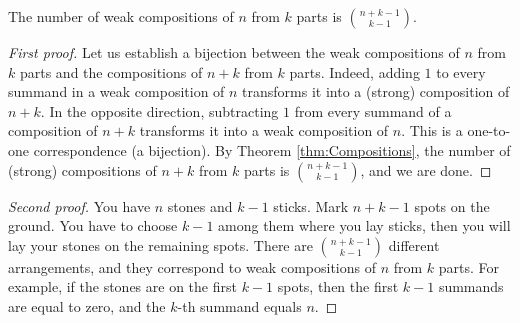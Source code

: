 \begin{page}
\setcounter{section}{3}
\setcounter{subsection}{5}
\setcounter{dfn}{13}
\label{portion:101}

\begin{thm}
\label{thm:WeakComp}
The number of weak compositions of $n$ from $k$ parts is $\binom{n+k-1}{k-1}$.
\end{thm}

\end{page}

\begin{page}
\setcounter{section}{3}
\setcounter{subsection}{6}
\setcounter{dfn}{13}
\label{portion:102}

\begin{proof}[First proof]
Let us establish a bijection between the weak compositions of $n$ from $k$ parts and the compositions of $n+k$ from $k$ parts.
Indeed, adding $1$ to every summand in a weak composition of $n$ transforms it into a (strong) composition of $n+k$.
In the opposite direction, subtracting $1$ from every summand of a composition of $n+k$ transforms it into
a weak composition of $n$.
This is a one-to-one correspondence (a bijection).
By Theorem \ref{thm:Compositions}, the number of (strong) compositions of $n+k$ from $k$ parts is $\binom{n+k-1}{k-1}$, and we are done.
\end{proof}

\begin{proof}[Second proof]
You have $n$ stones and $k-1$ sticks.
Mark $n+k-1$ spots on the ground.
You have to choose $k-1$ among them where you lay sticks, then you will lay your stones on the remaining spots.
There are $\binom{n+k-1}{k-1}$ different arrangements, and they correspond to weak compositions of $n$ from $k$ parts.
For example, if the stones are on the first $k-1$ spots, then the first $k-1$ summands are equal to zero, and the $k$-th summand equals $n$.
\end{proof}



\end{page}

